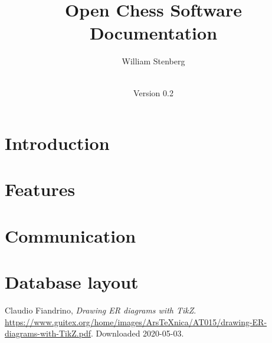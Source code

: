 \documentclass[a4paper,11pt,x11 names]{article}
\title{Open Chess Software Documentation}
\date{\documentdate\\Version 0.2}
\author{William Stenberg}
\begin{document}
\maketitle
\section{Introduction}

\section{Features}

\section{Communication}

\section{Database layout}

\newpage
\begin{thebibliography}{9}
       Claudio Fiandrino, 
       \textit{Drawing ER diagrams with TikZ}. 
       \url{https://www.guitex.org/home/images/ArsTeXnica/AT015/drawing-ER-diagrams-with-TikZ.pdf}. Downloaded 2020-05-03.
\end{thebibliography}
\end{document}
